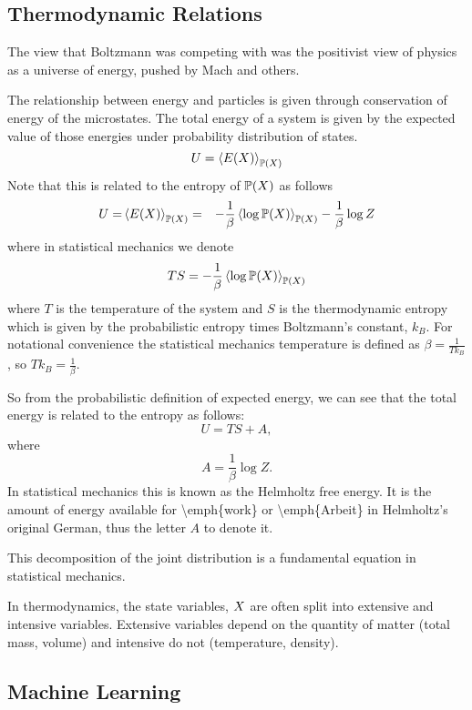 \documentclass[]{article}
\begin{document}
\subsection{Thermodynamic Relations}\label{thermodynamic-relations}

The view that Boltzmann was competing with was the positivist view of
physics as a universe of energy, pushed by Mach and others.

The relationship between energy and particles is given through
conservation of energy of the microstates. The total energy of a system
is given by the expected value of those energies under probability
distribution of states. \[
U = \left\langle E(X) \right\rangle_{\mathbb{P}(X)}
\] Note that this is related to the entropy of
\(\mathbb{P}(X)\) 
as follows
\begin{align*} 
U = &
\left\langle E(X) \right\rangle_{\mathbb{P}(X)}
 = &
-\frac{1}{\beta}\left\langle \log
\mathbb{P}(X) \right\rangle_{\mathbb{P}(X)}
- \frac{1}{\beta} \log Z
\end{align*} 
where in statistical mechanics we denote \[
TS = -\frac{1}{\beta}\left\langle \log\mathbb{P}(X) \right\rangle_{\mathbb{P}(X)}
\] 
where \(T\) is the temperature of the system and \(S\) is the
thermodynamic entropy which is given by the probabilistic entropy times
Boltzmann's constant, \(k_B\). For notational convenience the
statistical mechanics temperature is defined as
\(\beta = \frac{1}{T k_B}\), so \(Tk_B = \frac{1}{\beta}\).

So from the probabilistic definition of expected energy, we can see that
the total energy is related to the entropy as follows: 
\[
U = TS + A,
\] 
where 
\[
A = \frac{1}{\beta} \log Z.
\] 
In statistical mechanics this is known as the Helmholtz free energy.
It is the amount of energy available for \textbackslash emph\{work\} or
\textbackslash emph\{Arbeit\} in Helmholtz's original German, thus the
letter \(A\) to denote it.

This decomposition of the joint distribution is a fundamental equation
in statistical mechanics.

In thermodynamics, the state variables, \(X\) are often
split into extensive and intensive variables. Extensive variables depend
on the quantity of matter (total mass, volume) and intensive do not
(temperature, density).

\subsection{Machine Learning}\label{machine-learning}
\end{document}

